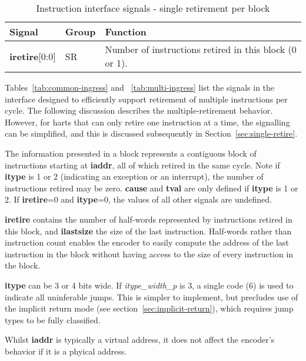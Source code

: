 \begin{table}[htp]
    \centering
    \caption{Instruction interface signals - single retirement per block}
    \label{tab:single-ingress}
    \begin{tabulary}{\textwidth}{|l|l|p{110mm}|}
        \hline
        \textbf{Signal} & \textbf{Group} & \textbf{Function} \\
        \hline
        \textbf{iretire}[0:0] & SR & Number of instructions retired in this block (0 or 1).\\
        \hline
    \end{tabulary}
\end{table}

Tables~\ref{tab:common-ingress} and ~\ref{tab:multi-ingress}
list the signals in the interface designed to efficiently support retirement of multiple 
instructions per cycle.  The following discussion describes the multiple-retirement behavior.  
However, for harts that can only retire one instruction at a time, the signalling can be 
simplified, and this is discussed subsequently in Section~\ref{sec:single-retire}.  

The information presented in a block represents a contiguous
block of instructions starting at \textbf{iaddr}, all of which retired
in the same cycle. Note if \textbf{itype} is 1 or 2 (indicating an
exception or an interrupt), the number of instructions retired may be
zero. \textbf{cause} and \textbf{tval} are only defined if
\textbf{itype} is 1 or 2. If \textbf{iretire}=0 and \textbf{itype}=0,
the values of all other signals are undefined.

\textbf{iretire} contains the number of half-words represented by
instructions retired in this block, and \textbf{ilastsize} the size of the last
instruction.  Half-words rather than instruction count enables the encoder to easily compute the address of
the last instruction in the block without having access to the size of every 
instruction in the block.  

\textbf{itype} can be 3 or 4 bits wide.  If \textit{itype\_width\_p} is 3, a single code (6) is used to 
indicate all uninferable jumps.  This is simpler to implement, but precludes use of the implicit return mode
(see section~\ref{sec:implicit-return}), which requires jump types to be fully classified.

Whilst \textbf{iaddr} is typically a virtual address, it does not affect the encoder's behavior
if it is a phyical address.


